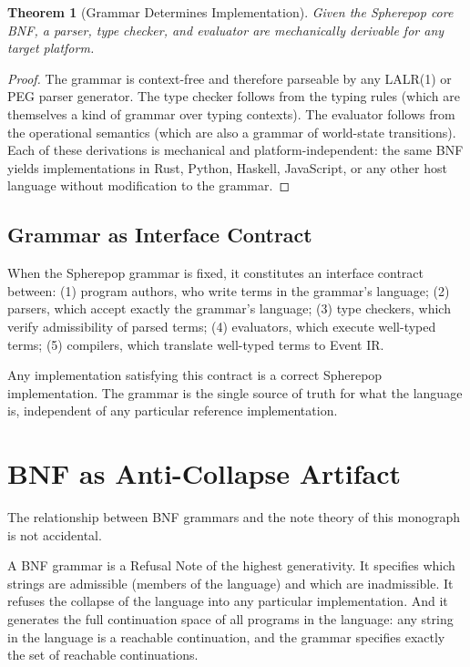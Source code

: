 \documentclass[12pt, a4paper, openany]{book}
\theoremstyle{plain}
\newtheorem{theorem}{Theorem}[chapter]
\theoremstyle{definition}
\theoremstyle{remark}
\begin{document}
\begin{theorem}[Grammar Determines Implementation]
Given the Spherepop core BNF, a parser, type checker, and evaluator are
mechanically derivable for any target platform.
\end{theorem}

\begin{proof}
The grammar is context-free and therefore parseable by any LALR(1) or PEG
parser generator. The type checker follows from the typing rules (which are
themselves a kind of grammar over typing contexts). The evaluator follows from
the operational semantics (which are also a grammar of world-state transitions).
Each of these derivations is mechanical and platform-independent: the same BNF
yields implementations in Rust, Python, Haskell, JavaScript, or any other host
language without modification to the grammar.
\end{proof}

\subsection{Grammar as Interface Contract}

When the Spherepop grammar is fixed, it constitutes an interface contract between:
(1) program authors, who write terms in the grammar's language;
(2) parsers, which accept exactly the grammar's language;
(3) type checkers, which verify admissibility of parsed terms;
(4) evaluators, which execute well-typed terms;
(5) compilers, which translate well-typed terms to Event IR.

Any implementation satisfying this contract is a correct Spherepop implementation.
The grammar is the single source of truth for what the language is, independent
of any particular reference implementation.

\section{BNF as Anti-Collapse Artifact}

The relationship between BNF grammars and the note theory of this monograph is
not accidental.

A BNF grammar is a Refusal Note of the highest generativity. It specifies which
strings are admissible (members of the language) and which are inadmissible. It
refuses the collapse of the language into any particular implementation. And it
generates the full continuation space of all programs in the language: any string
in the language is a reachable continuation, and the grammar specifies exactly
the set of reachable continuations.
\end{document}
